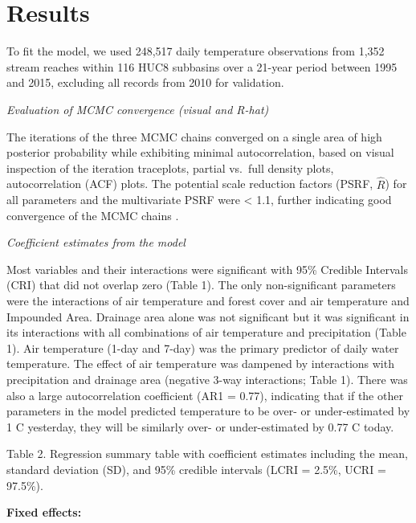 \documentclass[]{article}
\begin{document}
\section{Results}\label{results}

To fit the model, we used 248,517 daily temperature observations from
1,352 stream reaches within 116 HUC8 subbasins over a 21-year period
between 1995 and 2015, excluding all records from 2010 for validation.

\emph{Evaluation of MCMC convergence (visual and R-hat)}

The iterations of the three MCMC chains converged on a single area of
high posterior probability while exhibiting minimal autocorrelation,
based on visual inspection of the iteration traceplots, partial vs.~full
density plots, autocorrelation (ACF) plots. The potential scale
reduction factors (PSRF, \(\hat{R}\)) for all parameters and the
multivariate PSRF were \textless{} 1.1, further indicating good
convergence of the MCMC chains \citep{Brooks1998}.

\emph{Coefficient estimates from the model}

Most variables and their interactions were significant with 95\%
Credible Intervals (CRI) that did not overlap zero (Table 1). The only
non-significant parameters were the interactions of air temperature and
forest cover and air temperature and Impounded Area. Drainage area alone
was not significant but it was significant in its interactions with all
combinations of air temperature and precipitation (Table 1). Air
temperature (1-day and 7-day) was the primary predictor of daily water
temperature. The effect of air temperature was dampened by interactions
with precipitation and drainage area (negative 3-way interactions; Table
1). There was also a large autocorrelation coefficient (AR1 = 0.77),
indicating that if the other parameters in the model predicted
temperature to be over- or under-estimated by 1 C yesterday, they will
be similarly over- or under-estimated by 0.77 C today.

Table 2. Regression summary table with coefficient estimates including
the mean, standard deviation (SD), and 95\% credible intervals (LCRI =
2.5\%, UCRI = 97.5\%).

\textbf{Fixed effects:}
\end{document}
